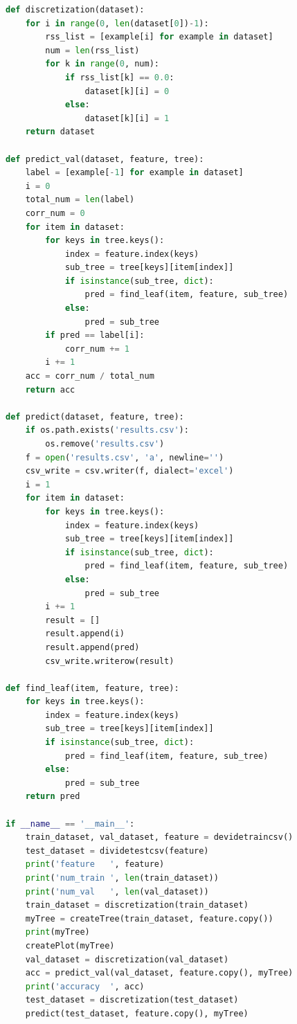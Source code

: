 \documentclass[UTF-8, a4paper, 10pt]{article}
\numberwithin{equation}{section}
\begin{document}
\begin{lstlisting}[language=python]
def discretization(dataset):
    for i in range(0, len(dataset[0])-1):
        rss_list = [example[i] for example in dataset]
        num = len(rss_list)
        for k in range(0, num):
            if rss_list[k] == 0.0:
                dataset[k][i] = 0
            else:
                dataset[k][i] = 1
    return dataset

def predict_val(dataset, feature, tree):
    label = [example[-1] for example in dataset]
    i = 0
    total_num = len(label)
    corr_num = 0
    for item in dataset:
        for keys in tree.keys():
            index = feature.index(keys)
            sub_tree = tree[keys][item[index]]
            if isinstance(sub_tree, dict):
                pred = find_leaf(item, feature, sub_tree)
            else:
                pred = sub_tree
        if pred == label[i]:
            corr_num += 1
        i += 1
    acc = corr_num / total_num
    return acc

def predict(dataset, feature, tree):
    if os.path.exists('results.csv'):
        os.remove('results.csv')
    f = open('results.csv', 'a', newline='')
    csv_write = csv.writer(f, dialect='excel')
    i = 1
    for item in dataset:
        for keys in tree.keys():
            index = feature.index(keys)
            sub_tree = tree[keys][item[index]]
            if isinstance(sub_tree, dict):
                pred = find_leaf(item, feature, sub_tree)
            else:
                pred = sub_tree
        i += 1
        result = []
        result.append(i)
        result.append(pred)
        csv_write.writerow(result)

def find_leaf(item, feature, tree):
    for keys in tree.keys():
        index = feature.index(keys)
        sub_tree = tree[keys][item[index]]
        if isinstance(sub_tree, dict):
            pred = find_leaf(item, feature, sub_tree)
        else:
            pred = sub_tree
    return pred

if __name__ == '__main__':
    train_dataset, val_dataset, feature = devidetraincsv()
    test_dataset = dividetestcsv(feature)
    print('feature   ', feature)
    print('num_train ', len(train_dataset))
    print('num_val   ', len(val_dataset))
    train_dataset = discretization(train_dataset)
    myTree = createTree(train_dataset, feature.copy())
    print(myTree)
    createPlot(myTree)
    val_dataset = discretization(val_dataset)
    acc = predict_val(val_dataset, feature.copy(), myTree)
    print('accuracy  ', acc)
    test_dataset = discretization(test_dataset)
    predict(test_dataset, feature.copy(), myTree)
\end{lstlisting}
\end{document}
